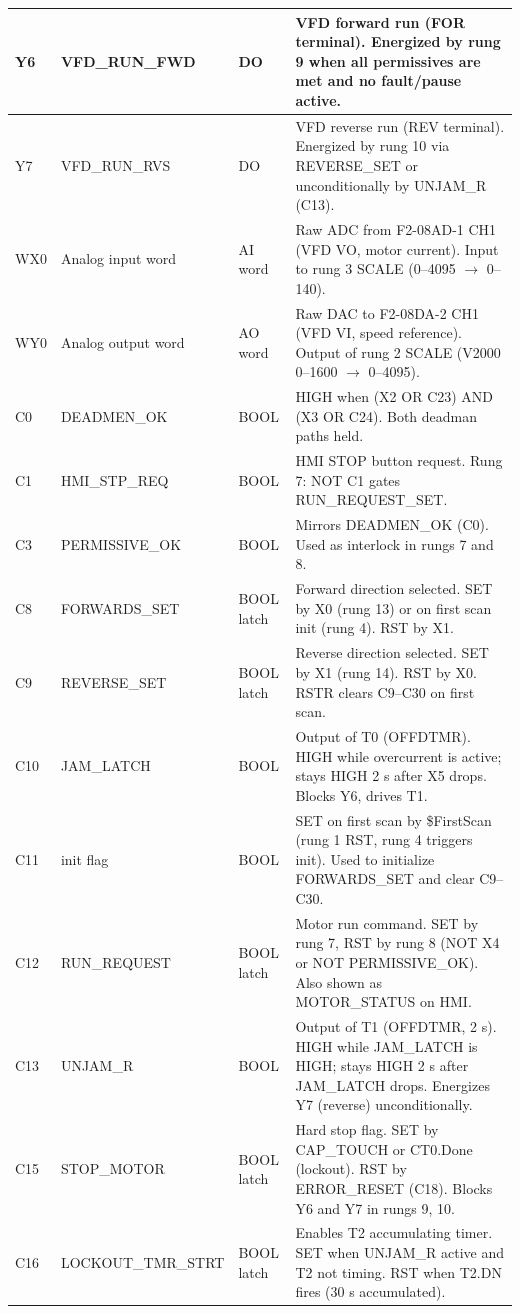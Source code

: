 \documentclass[hidelinks,12pt]{article}
\begin{document}
\begin{xltabular}{\textwidth}{|l|l|l|X|}
Y6 & VFD\_RUN\_FWD & DO & VFD forward run (FOR terminal). Energized by rung 9 when all permissives are met and no fault/pause active. \\ \hline
Y7 & VFD\_RUN\_RVS & DO & VFD reverse run (REV terminal). Energized by rung 10 via REVERSE\_SET or unconditionally by UNJAM\_R (C13). \\ \hline
WX0 & Analog input word & AI word & Raw ADC from F2-08AD-1 CH1 (VFD VO, motor current). Input to rung 3 SCALE (0--4095 $\rightarrow$ 0--140). \\ \hline
WY0 & Analog output word & AO word & Raw DAC to F2-08DA-2 CH1 (VFD VI, speed reference). Output of rung 2 SCALE (V2000 0--1600 $\rightarrow$ 0--4095). \\ \hline
C0 & DEADMEN\_OK & BOOL & HIGH when (X2 OR C23) AND (X3 OR C24). Both deadman paths held. \\ \hline
C1 & HMI\_STP\_REQ & BOOL & HMI STOP button request. Rung 7: NOT C1 gates RUN\_REQUEST\_SET. \\ \hline
C3 & PERMISSIVE\_OK & BOOL & Mirrors DEADMEN\_OK (C0). Used as interlock in rungs 7 and 8. \\ \hline
C8 & FORWARDS\_SET & BOOL latch & Forward direction selected. SET by X0 (rung 13) or on first scan init (rung 4). RST by X1. \\ \hline
C9 & REVERSE\_SET & BOOL latch & Reverse direction selected. SET by X1 (rung 14). RST by X0. RSTR clears C9--C30 on first scan. \\ \hline
C10 & JAM\_LATCH & BOOL & Output of T0 (OFFDTMR). HIGH while overcurrent is active; stays HIGH 2 s after X5 drops. Blocks Y6, drives T1. \\ \hline
C11 & init flag & BOOL & SET on first scan by \$FirstScan (rung 1 RST, rung 4 triggers init). Used to initialize FORWARDS\_SET and clear C9--C30. \\ \hline
C12 & RUN\_REQUEST & BOOL latch & Motor run command. SET by rung 7, RST by rung 8 (NOT X4 or NOT PERMISSIVE\_OK). Also shown as MOTOR\_STATUS on HMI. \\ \hline
C13 & UNJAM\_R & BOOL & Output of T1 (OFFDTMR, 2 s). HIGH while JAM\_LATCH is HIGH; stays HIGH 2 s after JAM\_LATCH drops. Energizes Y7 (reverse) unconditionally. \\ \hline
C15 & STOP\_MOTOR & BOOL latch & Hard stop flag. SET by CAP\_TOUCH or CT0.Done (lockout). RST by ERROR\_RESET (C18). Blocks Y6 and Y7 in rungs 9, 10. \\ \hline
C16 & LOCKOUT\_TMR\_STRT & BOOL latch & Enables T2 accumulating timer. SET when UNJAM\_R active and T2 not timing. RST when T2.DN fires (30 s accumulated). \\ \hline

\end{xltabular}
\end{document}
